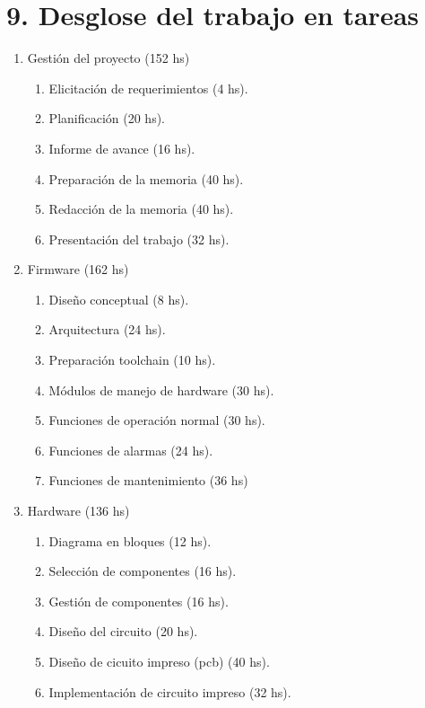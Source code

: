 \documentclass[
11pt, %
codirector, %
]{charter}
\begin{document}
\section{9. Desglose del trabajo en tareas}
\label{sec:wbs}


\begin{enumerate}
\item Gestión del proyecto (152 hs)
	\begin{enumerate}
	\item Elicitación de requerimientos (4 hs).
	\item Planificación (20 hs).
	\item Informe de avance (16 hs).
	\item Preparación de la memoria (40 hs).
	\item Redacción de la memoria (40 hs).
	\item Presentación del trabajo (32 hs).
	\end{enumerate}
\item Firmware (162 hs)
	\begin{enumerate}
	\item Diseño conceptual (8 hs).
	\item Arquitectura (24 hs).
	\item Preparación toolchain (10 hs).
	\item Módulos de manejo de hardware (30 hs).
	\item Funciones de operación normal (30 hs).
	\item Funciones de alarmas (24 hs).
	\item Funciones de mantenimiento (36 hs)
	\end{enumerate}
\item Hardware (136 hs)
	\begin{enumerate}
	\item Diagrama en bloques (12 hs).
	\item Selección de componentes (16 hs).
	\item Gestión de componentes (16 hs).
	\item Diseño del circuito (20 hs).
	\item Diseño de cicuito impreso (pcb) (40 hs).
	\item Implementación de circuito impreso (32 hs).

\end{enumerate}
\end{enumerate}
\end{document}
